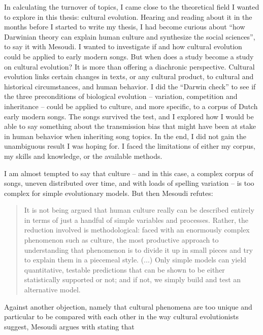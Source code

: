 In calculating the turnover of topics, I came close to the theoretical field I wanted to explore in this thesis: cultural evolution. Hearing and reading about it in the months before I started to write my thesis, I had become curious about \enquote{how Darwinian theory can explain human culture and synthesize the social sciences}, to say it with Mesoudi.\autocite{mesoudi_cultural_2011} I wanted to investigate if and how cultural evolution could be applied to early modern songs. But when does a study become a study on cultural evolution? It is more than offering a diachronic perspective. Cultural evolution links certain changes in texts, or any cultural product, to cultural and historical circumstances, and human behavior. I did the \enquote{Darwin check} to see if the three preconditions of biological evolution -- variation, competition and inheritance -- could be applied to culture, and more specific, to a corpus of Dutch early modern songs. The songs survived the test, and I explored how I would be able to say something about the transmission bias that might have been at stake in human behavior when inheriting song topics. In the end, I did not gain the unambiguous result I was hoping for. I faced the limitations of either my corpus, my skills and knowledge, or the available methods.

I am almost tempted to say that culture -- and in this case, a complex corpus of songs, uneven distributed over time, and with loads of spelling variation -- is too complex for simple evolutionary models. But then Mesoudi refutes:

\begin{quote}
	It is not being argued that human culture really can be described entirely in terms of just a handful of simple variables and processes. Rather, the reduction involved is methodological: faced with an enormously complex phenomenon such as culture, the most productive approach to understanding that phenomenon is to divide it up in small pieces and try to explain them in a piecemeal style. (...) Only simple models can yield quantitative, testable predictions that can be shown to be either statistically supported or not; and if not, we simply build and test an alternative model.\autocite[131]{mesoudi_cultural_2011}
\end{quote}

\noindent Against another objection, namely that cultural phenomena are too unique and particular to be compared with each other in the way cultural evolutionists suggest, Mesoudi argues with stating that

